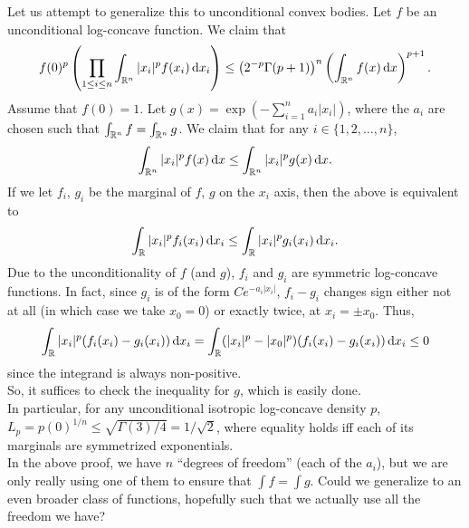 \documentclass{article}
\begin{document}
	Let us attempt to generalize this to unconditional convex bodies. Let $f$ be an unconditional log-concave function. We claim that
	\begin{equation}
		f(0)^p \left( \prod_{1 \le i \le n} \int_{\Rn} |x_i|^p f(x_i) \dif x_i \right) \le \left( 2^{-p} \Gamma(p+1) \right)^n \left( \int_{\Rn} f(x) \dif x \right)^{p+1}.
	\end{equation}
	Assume that $f(0) = 1$. Let $g(x) = \exp\left(-\sum_{i=1}^n a_i |x_i|\right)$, where the $a_i$ are chosen such that $\int_{\mathbb{R}^n} f = \int_{\mathbb{R}^n} g$. We claim that for any $i \in \{1,2,\ldots,n\}$,
		\[ \int_{\Rn} |x_i|^p f(x) \dif x \leq \int_{\Rn} |x_i|^p g(x) \dif x. \]
	If we let $f_i$, $g_i$ be the marginal of $f$, $g$ on the  $x_i$ axis, then the above is equivalent to
	\[ \int_{\R} |x_i|^p f_i(x_i) \dif x_i \le \int_{\R} |x_i|^p g_i(x_i) \dif x_i. \]
	Due to the unconditionality of $f$ (and $g$), $f_i$ and $g_i$ are symmetric log-concave functions. In fact, since $g_i$ is of the form $Ce^{-a_i |x_i|}$, $f_i - g_i$ changes sign either not at all (in which case we take $x_0 = 0$) or exactly twice, at $x_i = \pm x_0$. Thus,
		\[ \int_{\R} |x_i|^p (f_i(x_i) - g_i(x_i)) \dif x_i = \int_{\R} (|x_i|^p - |x_0|^p) (f_i(x_i) - g_i(x_i)) \dif x_i \le 0 \]
	since the integrand is always non-positive.\\
	So, it suffices to check the inequality for $g$, which is easily done.\\

	In particular, for any unconditional isotropic log-concave density $p$, $L_p = p(0)^{1/n} \leq \sqrt{\Gamma(3)/4} = 1/\sqrt{2}$, where equality holds iff each of its marginals are symmetrized exponentials.\\

	In the above proof, we have $n$ ``degrees of freedom'' (each of the $a_i$), but we are only really using one of them to ensure that $\int f = \int g$. Could we generalize to an even broader class of functions, hopefully such that we actually use all the freedom we have?



\end{document}
